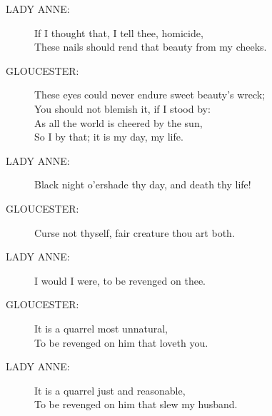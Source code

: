 \documentclass{article}
\begin{document}
\begin{description}
\item[LADY ANNE:] 
\hspace{1pt}If I thought that, I tell thee, homicide,\\
\hspace{1pt}These nails should rend that beauty from my cheeks.\\
\end{description}
\begin{description}
\item[GLOUCESTER:] 
\hspace{1pt}These eyes could never endure sweet beauty's wreck;\\
\hspace{1pt}You should not blemish it, if I stood by:\\
\hspace{1pt}As all the world is cheered by the sun,\\
\hspace{1pt}So I by that; it is my day, my life.\\
\end{description}
\begin{description}
\item[LADY ANNE:] 
\hspace{1pt}Black night o'ershade thy day, and death thy life!\\
\end{description}
\begin{description}
\item[GLOUCESTER:] 
\hspace{1pt}Curse not thyself, fair creature thou art both.\\
\end{description}
\begin{description}
\item[LADY ANNE:] 
\hspace{1pt}I would I were, to be revenged on thee.\\
\end{description}
\begin{description}
\item[GLOUCESTER:] 
\hspace{1pt}It is a quarrel most unnatural,\\
\hspace{1pt}To be revenged on him that loveth you.\\
\end{description}
\begin{description}
\item[LADY ANNE:] 
\hspace{1pt}It is a quarrel just and reasonable,\\
\hspace{1pt}To be revenged on him that slew my husband.\\
\end{description}
\end{document}
